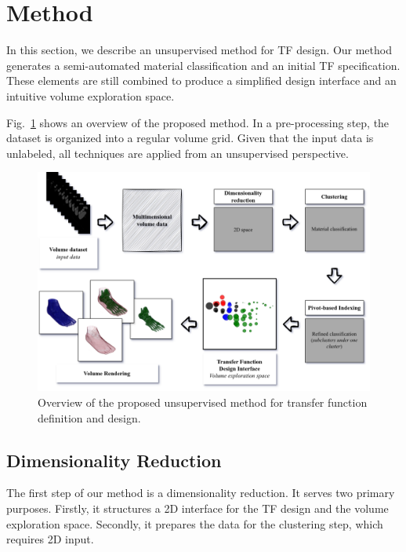 \section{Method}
\label{sect:method}
In this section, we describe an unsupervised method for TF design. Our method generates a semi-automated material classification and an initial TF specification. These elements are still combined to produce a simplified design interface and an intuitive volume exploration space. 

Fig.~\ref{fig:volume-exploration-pipeline} shows an overview of the proposed method. In a pre-processing step, the dataset is organized into a regular volume grid. Given that the input data is unlabeled, all techniques are applied from an unsupervised perspective. 

\begin{figure}[htb!]
    \centering
    \caption{Overview of the proposed unsupervised method for transfer function definition and design.}
    \label{fig:volume-exploration-pipeline}
    \includegraphics[width=\textwidth]{figs/method-overview.png}
\end{figure}



\subsection{Dimensionality Reduction}
\label{subsect:feature-extraction}
The first step of our method is a dimensionality reduction. It serves two primary purposes. Firstly, it structures a 2D interface for the TF design and the volume exploration space. Secondly, it prepares the data for the clustering step, which requires 2D input.

